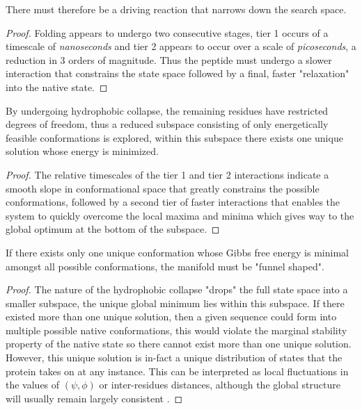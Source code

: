\begin{lemma}
    There must therefore be a driving reaction that narrows down the search space.
\end{lemma}
\begin{proof}
    Folding appears to undergo two consecutive stages, tier 1
    occurs of a timescale of \emph{nanoseconds} and tier 2 appears
    to occur over a scale of \emph{picoseconds}, a reduction in 3
    orders of magnitude. Thus the peptide must undergo a slower
    interaction that constrains the state space followed by a final, 
    faster "relaxation" into the native state.
\end{proof}
\begin{lemma}
    By undergoing hydrophobic collapse,
    the remaining residues have restricted degrees of freedom,
    thus a reduced subspace consisting of
    only energetically feasible conformations is explored, 
    within this subspace there exists one unique solution whose
    energy is minimized.
\end{lemma}
\begin{proof}
    The relative timescales of the tier 1 and tier 2 interactions indicate
    a smooth slope in conformational space that greatly 
    constrains the possible conformations, followed by a 
    second tier of faster interactions that enables the system to
    quickly overcome the local maxima and minima 
    which gives way to the global optimum at the bottom of the subspace.
\end{proof}
\begin{lemma}
    If there exists only one unique conformation whose Gibbs free energy
    is minimal amongst all possible conformations, the manifold must be
    "funnel shaped".
\end{lemma}
\begin{proof}
    The nature of the hydrophobic collapse
    "drops" the full state space into a smaller subspace,
    the unique global minimum lies within this subspace.
    If there existed more than one unique solution, then a given
    sequence could form into multiple possible native conformations, this
    would violate the marginal stability property of the native state
    so there cannot exist more than one unique solution. However, this unique 
    solution is in-fact a unique distribution of states that the protein
    takes on at any instance. This can be interpreted as local fluctuations
    in the values of $(\psi, \phi)$ or inter-residues distances, although
    the global structure will usually remain largely consistent \cite{Yang}.
\end{proof}

